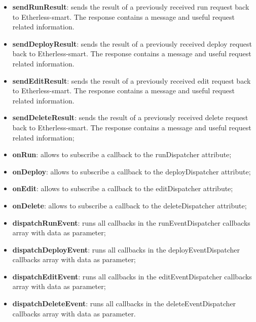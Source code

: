 	\begin{itemize}
		\item \textbf{sendRunResult}: sends the result of a previously received run request back to Etherless-smart. The response contains a message and useful request related information.
		\item \textbf{sendDeployResult}: sends the result of a previously received deploy request back to Etherless-smart. The response contains a message and useful request related information.
		\item \textbf{sendEditResult}: sends the result of a previously received edit request back to Etherless-smart. The response contains a message and useful request related information.
		\item \textbf{sendDeleteResult}: sends the result of a previously received delete request back to Etherless-smart. The response contains a message and useful request related information;
		\item \textbf{onRun}: allows to subscribe a callback to the runDispatcher attribute;
		\item \textbf{onDeploy}: allows to subscribe a callback to the deployDispatcher attribute;
		\item \textbf{onEdit}: allows to subscribe a callback to the editDispatcher attribute;
		\item \textbf{onDelete}: allows to subscribe a callback to the deleteDispatcher attribute;
		\item \textbf{dispatchRunEvent}: runs all callbacks in the runEventDispatcher callbacks array with data as parameter;
		\item \textbf{dispatchDeployEvent}: runs all callbacks in the deployEventDispatcher callbacks array with data as parameter;
		\item \textbf{dispatchEditEvent}: runs all callbacks in the editEventDispatcher callbacks array with data as parameter;
		\item \textbf{dispatchDeleteEvent}: runs all callbacks in the deleteEventDispatcher callbacks array with data as parameter.
	\end{itemize}

